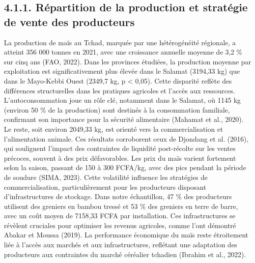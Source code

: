 \documentclass[12pt,oneside]{report}
\begin{document}
\subsection{4.1.1. Répartition de la production et stratégie de vente des producteurs}
La production de maïs au Tchad, marquée par une hétérogénéité régionale, a atteint 356 000 tonnes en 2021, avec une croissance annuelle moyenne de 3,2 \% sur cinq ans (FAO, 2022). Dans les provinces étudiées, la production moyenne par exploitation est significativement plus élevée dans le Salamat (3194,33 kg) que dans le Mayo-Kebbi Ouest (2349,7 kg, p < 0,05). Cette disparité reflète des différences structurelles dans les pratiques agricoles et l'accès aux ressources. L’autoconsommation joue un rôle clé, notamment dans le Salamat, où 1145 kg (environ 50 \% de la production) sont destinés à la consommation familiale, confirmant son importance pour la sécurité alimentaire (Mahamat et al., 2020). Le reste, soit environ 2049,33 kg, est orienté vers la commercialisation et l’alimentation animale. Ces résultats corroborent ceux de Djondang et al. (2016), qui soulignent l’impact des contraintes de liquidité post-récolte sur les ventes précoces, souvent à des prix défavorables. Les prix du maïs varient fortement selon la saison, passant de 150 à 300 FCFA/kg, avec des pics pendant la période de soudure (SIMA, 2023). Cette volatilité influence les stratégies de commercialisation, particulièrement pour les producteurs disposant d’infrastructures de stockage. Dans notre échantillon, 47 \% des producteurs utilisent des greniers en bambou tressé et 53 \% des greniers en terre de barre, avec un coût moyen de 7158,33 FCFA par installation. Ces infrastructures se révèlent cruciales pour optimiser les revenus agricoles, comme l'ont démontré Abakar et Moussa (2019). La performance économique du maïs reste étroitement liée à l’accès aux marchés et aux infrastructures, reflétant une adaptation des producteurs aux contraintes du marché céréalier tchadien (Ibrahim et al., 2022).
\end{document}
